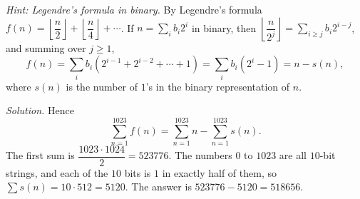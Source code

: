 \emph{Hint: Legendre's formula in binary.} By Legendre's formula $f(n)=\left\lfloor\dfrac {n}{2}\right\rfloor+\left\lfloor\dfrac {n}{4}\right\rfloor+\cdots$. If $n=\sum_i b_i2^i$ in binary, then $\left\lfloor\dfrac{n}{2^j}\right\rfloor=\sum_{i\ge j}b_i2^{i-j}$, and summing over $j\ge1$,
\[
f(n)=\sum_i b_i\left(2^{i-1}+2^{i-2}+\cdots+1\right)=\sum_ib_i\left(2^i-1\right)=n-s(n),
\]
where $s(n)$ is the number of $1$'s in the binary representation of $n$.

\emph{Solution.} Hence
\[
\sum_{n=1}^{1023}f(n)=\sum_{n=1}^{1023}n-\sum_{n=1}^{1023}s(n).
\]
The first sum is $\dfrac{1023\cdot1024}{2}=523776$. The numbers $0$ to $1023$ are all $10$-bit strings, and each of the $10$ bits is $1$ in exactly half of them, so $\sum s(n)=10\cdot512=5120$. The answer is $523776-5120=\boxed{518656}$.
